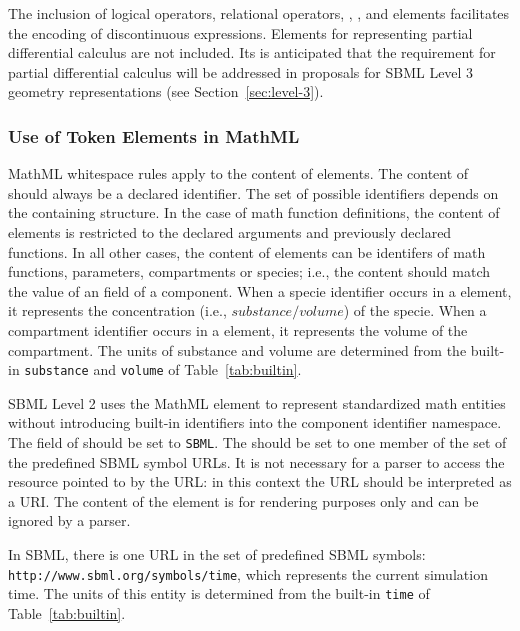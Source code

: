 \documentclass[10pt,twocolumntoc]{cekarticle}
\newcommand{\vref}[1]{\ref{#1}}
\begin{document}
The inclusion of logical operators, relational operators,
, , and  elements
facilitates the encoding of discontinuous expressions.  Elements for
representing partial differential calculus are not included.  Its is
anticipated that the requirement for partial differential calculus will be
addressed in proposals for SBML Level 3 geometry representations (see
Section~\ref{sec:level-3}).

\subsubsection{Use of Token Elements in MathML}
\label{sec:mathmltokens}

MathML whitespace rules apply to the content of  elements. The
content of  should always be a declared identifier.  The set of
possible identifiers depends on the containing structure.  In the case of
math function definitions, the content of  elements is restricted
to the declared arguments and previously declared functions.  In all other
cases, the content of  elements can be identifers of math
functions, parameters, compartments or species; i.e., the content should
match the value of an  field of a component.  When a specie
identifier occurs in a  element, it represents the concentration
(i.e., $substance/volume$) of the specie.  When a compartment identifier
occurs in a  element, it represents the volume of the
compartment. The units of substance and volume are determined from the
built-in \texttt{substance} and \texttt{volume} of
Table~\vref{tab:builtin}.

SBML Level 2 uses the MathML  element to represent
standardized math entities without introducing built-in identifiers into
the component identifier namespace.  The  field of
 should be set to \texttt{SBML}.  The 
should be set to one member of the set of the predefined SBML symbol URLs.
It is not necessary for a parser to access the resource pointed to by the
URL: in this context the URL should be interpreted as a URI.  The content
of the  element is for rendering purposes only and can be
ignored by a parser.

In SBML, there is one URL in the set of predefined SBML symbols:
\texttt{http://www.sbml.org/symbols/time}, which represents the current
simulation time.  The units of this entity is determined from the built-in
\texttt{time} of Table~\vref{tab:builtin}.
\end{document}
